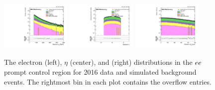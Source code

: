 \begin{figure}
\centering
\includegraphics[width=0.3\textwidth]{figures/selection/pcr_ee_2016/electronPt.pdf}
\includegraphics[width=0.3\textwidth]{figures/selection/pcr_ee_2016/electronEta.pdf}
\includegraphics[width=0.3\textwidth]{figures/selection/pcr_ee_2016/electronAbsD0_50um.pdf}
\caption{The electron \pt (left), $\eta$ (center), and \ad (right) distributions in the $ee$ prompt control region for 2016 data and simulated background events. The rightmost bin in each plot contains the overflow entries.}
\label{pcr_ee_2016}
\end{figure}